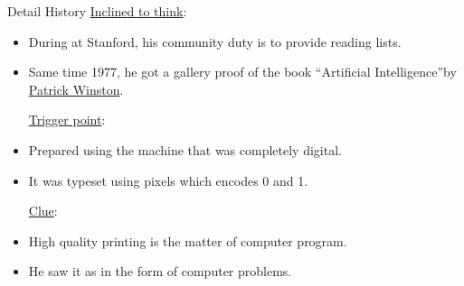 \documentclass[11pt]{beamer}
\begin{document}
\begin{frame}{Detail History}
\underline{\color{brown} Inclined to think}:\

\begin{itemize}

\item During at Stanford, his community duty is to provide reading lists.

\item Same time 1977, he got a gallery proof of the book \textquotedblleft Artificial Intelligence\textquotedblright by {\color{blue}\href{https://en.wikipedia.org/wiki/Patrick_Winston}{Patrick Winston}}.  

\pause

\underline{\color{brown} Trigger point}:

\item Prepared using the machine that was completely digital.

\item It was typeset using pixels which encodes 0 and 1.

\pause

\underline{\color{brown} Clue}:

\item High quality printing is the matter of computer program. 

\item He saw it as in the form of computer problems.


\end{itemize}
\end{frame}


\end{document}
